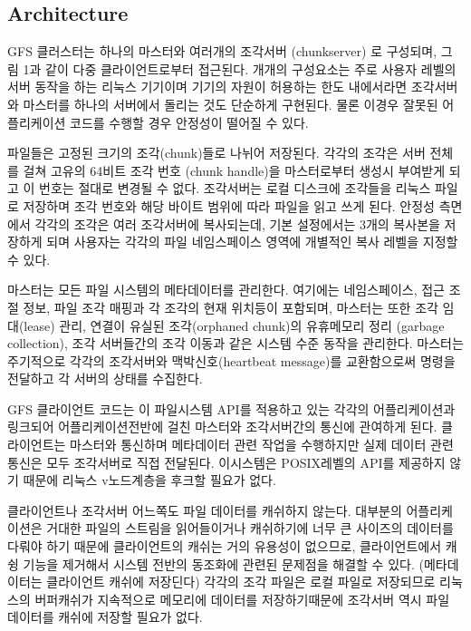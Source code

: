 \documentclass[twocolumn]{article}
\begin{document}
\subsection{Architecture}

  GFS 클러스터는 하나의 마스터와 여러개의 조각서버 (chunkserver) 로 구성되며, 그림 1과 같이 다중 클라이언트로부터 접근된다.  개개의 구성요소는 주로 사용자 레벨의 서버 동작을 하는 리눅스 기기이며 기기의 자원이 허용하는 한도 내에서라면 조각서버와 마스터를 하나의 서버에서 돌리는 것도 단순하게 구현된다.  물론 이경우 잘못된 어플리케이션 코드를 수행할 경우 안정성이 떨어질 수 있다.

 파일들은 고정된 크기의 조각(chunk)들로 나뉘어 저장된다.  각각의 조각은 서버 전체를 걸쳐 고유의 64비트 조각 번호 (chunk handle)을 마스터로부터 생성시 부여받게 되고 이 번호는 절대로 변경될 수 없다.  조각서버는 로컬 디스크에 조각들을 리눅스 파일로 저장하며 조각 번호와 해당 바이트 범위에 따라 파일을 읽고 쓰게 된다.  안정성 측면에서 각각의 조각은 여러 조각서버에 복사되는데, 기본 설정에서는 3개의 복사본을 저장하게 되며 사용자는 각각의 파일 네임스페이스 영역에 개별적인 복사 레벨을 지정할 수 있다.

 마스터는 모든 파일 시스템의 메타데이터를 관리한다.  여기에는 네임스페이스, 접근 조절 정보, 파일 조각 매핑과 각 조각의 현재 위치등이 포함되며, 마스터는 또한 조각 임대(lease) 관리, 연결이 유실된 조각(orphaned chunk)의 유휴메모리 정리 (garbage collection), 조각 서버들간의 조각 이동과 같은 시스템 수준 동작을 관리한다.  마스터는 주기적으로 각각의 조각서버와 맥박신호(heartbeat message)를 교환함으로써 명령을 전달하고 각 서버의 상태를 수집한다.

 GFS 클라이언트 코드는 이 파일시스템 API를 적용하고 있는 각각의 어플리케이션과 링크되어 어플리케이션전반에 걸친 마스터와 조각서버간의 통신에 관여하게 된다.  클라이언트는 마스터와 통신하며 메타데이터 관련 작업을 수행하지만 실제 데이터 관련 통신은 모두 조각서버로 직접 전달된다.  이시스템은 POSIX레벨의 API를 제공하지 않기 때문에 리눅스 v노드계층을 후크할 필요가 없다.

  클라이언트나 조각서버 어느쪽도 파일 데이터를 캐쉬하지 않는다.  대부분의 어플리케이션은 거대한 파일의 스트림을 읽어들이거나 캐쉬하기에 너무 큰 사이즈의 데이터를 다뤄야 하기 때문에 클라이언트의 캐쉬는 거의 유용성이 없으므로, 클라이언트에서 캐슁 기능을 제거해서 시스템 전반의 동조화에 관련된 문제점을 해결할 수 있다. (메타데이터는 클라이언트 캐쉬에 저장딘다)  각각의 조각 파일은 로컬 파일로 저장되므로 리눅스의 버퍼캐쉬가 지속적으로 메모리에 데이터를 저장하기때문에 조각서버 역시 파일 데이터를 캐쉬에 저장할 필요가 없다.
\end{document}
